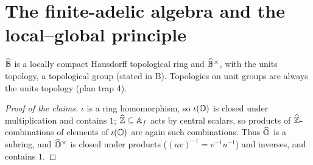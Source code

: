 \section{The finite-adelic algebra and the local--global principle}\label{sec:qcls-adelic}

\begin{definition}
\end{definition}
\noindent $\widehat{\mathbb{B}}$ is a locally compact Hausdorff topological ring and $\widehat{\mathbb{B}}^\times$, with the units topology, a topological group (stated in B).
Topologies on unit groups are always the units topology (plan trap 4).

\begin{definition}
\end{definition}
\begin{proof}[Proof of the claims]
$\iota$ is a ring homomorphism, so $\iota(\mathbb{O})$ is closed under multiplication and contains $1$; $\widehat{\mathbb{Z}}\subseteq\mathbb{A}_f$ acts by central scalars, so
products of $\widehat{\mathbb{Z}}$-combinations of elements of $\iota(\mathbb{O})$ are again such combinations. Thus $\widehat{\mathbb{O}}$ is a subring, and $\widehat{\mathbb{O}}^\times$ is closed under
products ($(uv)^{-1}=v^{-1}u^{-1}$) and inverses, and contains $1$.
\end{proof}

